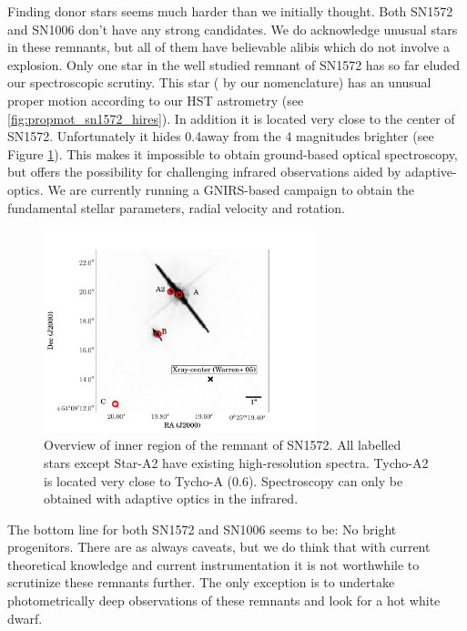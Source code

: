 Finding donor stars seems much harder than we initially thought. Both SN1572 and SN1006 don't have any strong candidates. We do acknowledge unusual stars in these remnants, but all of them have believable alibis which do not involve a \snia explosion. Only one star in the well studied remnant of SN1572 has so far eluded our spectroscopic scrutiny. This star ( by our nomenclature) has an unusual proper motion according to our HST astrometry (see \ref{fig:propmot_sn1572_hires}). In addition it is located very close to the \xray center of SN1572. Unfortunately it hides 0.4\arcsec away from the 4 magnitudes brighter \stara (see Figure \ref{fig:stara2_overview}). This makes it impossible to obtain ground-based optical spectroscopy, but offers the possibility for challenging infrared observations aided by adaptive-optics. We are currently running a GNIRS-based campaign to obtain the fundamental stellar parameters, radial velocity and rotation. 

\begin{figure}[htbp] %
   \centering
   \includegraphics[width=0.7\textwidth]{chapter_conclusion/plots/overview_sn1572_a2.pdf} 
   \caption{Overview of inner region of the remnant of SN1572. All labelled stars except Star-A2 have existing high-resolution spectra. Tycho-A2 is located very close to Tycho-A (0.6\arcsec). Spectroscopy can only be obtained with adaptive optics in the infrared.}
   \label{fig:stara2_overview}
\end{figure}

The bottom line for both SN1572 and SN1006 seems to be: No bright progenitors. There are as always caveats, but we do think that with current theoretical knowledge and current instrumentation it is not worthwhile to scrutinize these remnants further. The only exception is to undertake photometrically deep observations of these remnants and look for a hot white dwarf. 

